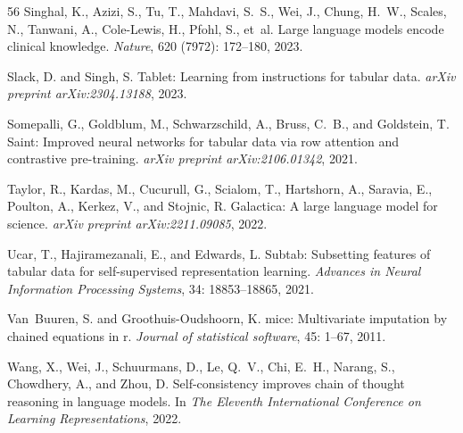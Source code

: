 \documentclass{article}
\theoremstyle{plain}
\theoremstyle{definition}
\theoremstyle{remark}
\begin{document}
\begin{thebibliography}{56}
Singhal, K., Azizi, S., Tu, T., Mahdavi, S.~S., Wei, J., Chung, H.~W., Scales,
  N., Tanwani, A., Cole-Lewis, H., Pfohl, S., et~al.
\newblock Large language models encode clinical knowledge.
\newblock \emph{Nature}, 620 (7972): 172--180, 2023.

Slack, D. and Singh, S.
\newblock Tablet: Learning from instructions for tabular data.
\newblock \emph{arXiv preprint arXiv:2304.13188}, 2023.

Somepalli, G., Goldblum, M., Schwarzschild, A., Bruss, C.~B., and Goldstein, T.
\newblock Saint: Improved neural networks for tabular data via row attention
  and contrastive pre-training.
\newblock \emph{arXiv preprint arXiv:2106.01342}, 2021.

Taylor, R., Kardas, M., Cucurull, G., Scialom, T., Hartshorn, A., Saravia, E.,
  Poulton, A., Kerkez, V., and Stojnic, R.
\newblock Galactica: A large language model for science.
\newblock \emph{arXiv preprint arXiv:2211.09085}, 2022.

Ucar, T., Hajiramezanali, E., and Edwards, L.
\newblock Subtab: Subsetting features of tabular data for self-supervised
  representation learning.
\newblock \emph{Advances in Neural Information Processing Systems},
  34: 18853--18865, 2021.

Van~Buuren, S. and Groothuis-Oudshoorn, K.
\newblock mice: Multivariate imputation by chained equations in r.
\newblock \emph{Journal of statistical software}, 45: 1--67, 2011.

Wang, X., Wei, J., Schuurmans, D., Le, Q.~V., Chi, E.~H., Narang, S.,
  Chowdhery, A., and Zhou, D.
\newblock Self-consistency improves chain of thought reasoning in language
  models.
\newblock In \emph{The Eleventh International Conference on Learning
  Representations}, 2022.


\end{thebibliography}
\end{document}
